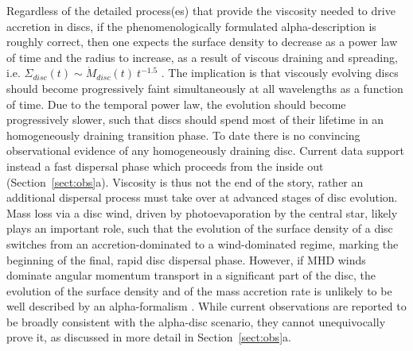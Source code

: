 \documentclass{rsos}
\begin{document}
Regardless of the detailed process(es) that provide the viscosity needed to drive accretion in discs, if the phenomenologically formulated alpha-description is roughly correct, then one expects the surface density to decrease as a power law of time and the radius to increase, as a result of viscous draining and spreading, i.e.  $\Sigma_{disc}(t) \sim \dot M_{disc}(t)~t^{-1.5}$
\cite{1998ApJ...495..385H}. The implication is that viscously evolving discs should become progressively faint simultaneously at all wavelengths as a function of time. Due to the temporal power law, the evolution should become progressively slower, such that discs should spend most of their lifetime in an homogeneously draining transition phase. To date there is no convincing observational evidence of any homogeneously draining disc. Current data support instead a fast dispersal phase which proceeds from the inside out (Section~\ref{sect:obs}a). Viscosity is thus not the end of the story, rather an additional dispersal process must take over at advanced stages of disc evolution. Mass loss via a disc wind, driven by photoevaporation by the central star, likely plays an important role, such that the evolution of the surface density of a disc switches from an accretion-dominated to a wind-dominated regime, marking the beginning of  the final, rapid disc dispersal phase. However, if MHD winds dominate angular momentum transport in a significant part of the disc, the evolution of the surface density and of the mass accretion rate is unlikely to be well described by an alpha-formalism 
\cite{2015ApJ...815..112K, 2016ApJ...821...80B} . While current observations are reported to be broadly consistent with the alpha-disc scenario, they cannot unequivocally prove it, as discussed in more detail in Section~\ref{sect:obs}a. 
\end{document}
